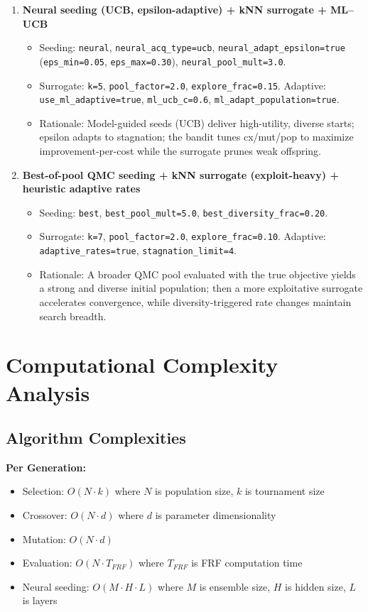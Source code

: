 \documentclass[12pt,a4paper]{article}
\begin{document}
\begin{enumerate}
\item \textbf{Neural seeding (UCB, epsilon-adaptive) + kNN surrogate + ML–UCB}
\begin{itemize}
\item Seeding: \texttt{neural}, \texttt{neural\_acq\_type=ucb}, \texttt{neural\_adapt\_epsilon=true} (\texttt{eps\_min=0.05}, \texttt{eps\_max=0.30}), \texttt{neural\_pool\_mult=3.0}.
\item Surrogate: \texttt{k=5}, \texttt{pool\_factor=2.0}, \texttt{explore\_frac=0.15}. Adaptive: \texttt{use\_ml\_adaptive=true}, \texttt{ml\_ucb\_c=0.6}, \texttt{ml\_adapt\_population=true}.
\item Rationale: Model-guided seeds (UCB) deliver high-utility, diverse starts; epsilon adapts to stagnation; the bandit tunes cx/mut/pop to maximize improvement-per-cost while the surrogate prunes weak offspring.
\end{itemize}

\item \textbf{Best-of-pool QMC seeding + kNN surrogate (exploit-heavy) + heuristic adaptive rates}
\begin{itemize}
\item Seeding: \texttt{best}, \texttt{best\_pool\_mult=5.0}, \texttt{best\_diversity\_frac=0.20}.
\item Surrogate: \texttt{k=7}, \texttt{pool\_factor=2.0}, \texttt{explore\_frac=0.10}. Adaptive: \texttt{adaptive\_rates=true}, \texttt{stagnation\_limit=4}.
\item Rationale: A broader QMC pool evaluated with the true objective yields a strong and diverse initial population; then a more exploitative surrogate accelerates convergence, while diversity-triggered rate changes maintain search breadth.
\end{itemize}

\end{enumerate}

\section{Computational Complexity Analysis}

\subsection{Algorithm Complexities}
\textbf{Per Generation:}
\begin{itemize}
\item Selection: $O(N \cdot k)$ where $N$ is population size, $k$ is tournament size
\item Crossover: $O(N \cdot d)$ where $d$ is parameter dimensionality
\item Mutation: $O(N \cdot d)$
\item Evaluation: $O(N \cdot T_{FRF})$ where $T_{FRF}$ is FRF computation time
\item Neural seeding: $O(M \cdot H \cdot L)$ where $M$ is ensemble size, $H$ is hidden size, $L$ is layers
\end{itemize}
\end{document}
